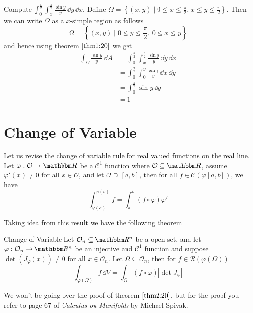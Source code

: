 \documentclass[../Analysis-3]{subfiles}
\begin{document}
\begin{Eg}{}{}
    Compute $\displaystyle{ \int_0^{\frac{\pi}{2}} \int_x^{\frac{\pi}{2}}} \frac{\sin y}{y} \, \dd y \, \dd x$. Define $\Omega = \left\{ (x,y) \mid 0 \leq x \leq \frac{\pi}{2}, \, x \leq y \leq \frac{\pi}{2} \right\}$. Then we can write $\Omega$ as a $x$-simple region as follows
    \[
        \Omega = \left\{ (x,y) \mid 0 \leq y \leq \frac{\pi}{2}, \, 0 \leq x \leq y \right\}    
    \]
    and hence using theorem $\ref{thm1:20}$ we get 
    \begin{align*}
        \int_{\Omega} \frac{\sin y}{y} \, \dd A &= \int_{0}^{\frac{\pi}{2}} \int_x^{\frac{\pi}{2}} \frac{\sin y}{y} \, \dd y \, \dd x \\ 
        &= \int_0^{\frac{\pi}{2}} \int_0^y \frac{\sin y}{y} \, \dd x \, \dd y \\ 
        &= \int_0^{\frac{\pi}{2}} \sin y \, \dd y \\ 
        &= 1
    \end{align*}
\end{Eg}

\section{Change of Variable}

Let us revise the change of variable rule for real valued functions on the real line. Let $\varphi : \mathcal{O} \to \R$ be a $\mathscr{C}^1$ function where $\mathcal{O} \subseteq \R$, assume $\varphi'(x) \neq 0$ for all $x \in \mathcal{O}$, and let $\mathcal{O} \supseteq [a,b]$, then for all $f \in \mathscr{C}(\varphi[a,b])$, we have 
\[
    \int_{\varphi(a)}^{\varphi(b)} f = \int_a^b (f \circ \varphi) \varphi'     
\]

Taking idea from this result we have the following theorem 

\begin{Thm}{Change of Variable}{}\label{thm2:20}
    Let $\mathcal{O}_n \subseteq \R^n$ be a open set, and let $\varphi : \mathcal{O}_n \to \R^n$ be an injective and $\mathscr{C}^1$ function and suppose $\det(J_{\varphi}(x)) \neq 0$ for all $x \in \mathcal{O}_n$. Let $\Omega \subseteq \mathcal{O}_n$, then for $f \in \mathscr{R}(\varphi(\Omega))$ 
    \[
        \int_{\varphi(\Omega)} f \, \dd V = \int_{\Omega} (f \circ \varphi) |\det J_{\varphi}|     
    \]
\end{Thm}
We won't be going over the proof of theorem $\ref{thm2:20}$, but for the proof you refer to page 67 of \textit{Calculus on Manifolds} by Michael Spivak.
\end{document}

